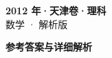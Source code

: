 \documentclass[zihao=-4, a4paper]{ctexart}
\begin{document}
\begin{center}
  {\Large\bfseries 2012 年·天津卷·理科}\\[4pt]
  {\large 数学 · 解析版}
\end{center}
\medskip
{}

\clearpage
{}
\begin{center}{\Large\bfseries 参考答案与详细解析}\end{center}
\medskip

\end{document}
